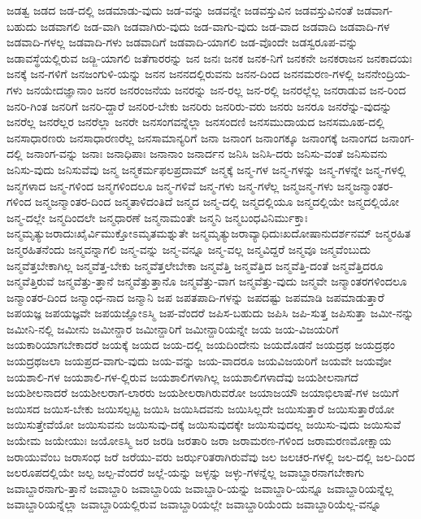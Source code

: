 {ಜಡತ್ವ
ಜಡದ
ಜಡ-ದಲ್ಲಿ
ಜಡಮಾಡು-ವುದು
ಜಡ-ವನ್ನು
ಜಡವನ್ನೇ
ಜಡವಸ್ತುವಿನ
ಜಡವಸ್ತುವಿನಂತೆ
ಜಡವಾಗ-ಬಹುದು
ಜಡವಾಗಲಿ
ಜಡ-ವಾಗಿ
ಜಡವಾಗಿರು-ವುದು
ಜಡ-ವಾಗು-ವುದು
ಜಡ-ವಾದ
ಜಡವಾದಿ
ಜಡವಾದಿ-ಗಳ
ಜಡವಾದಿ-ಗಳಲ್ಲ
ಜಡವಾದಿ-ಗಳು
ಜಡವಾದಿಗೆ
ಜಡವಾದಿ-ಯಾಗಲಿ
ಜಡ-ವೊಂದೇ
ಜಡಸ್ವರೂಪ-ವನ್ನು
ಜಡಾವಸ್ಥೆಯಲ್ಲಿರುವ
ಜಡ್ಜಿ-ಯಾಗಲಿ
ಜತೆಗಾರರನ್ನು
ಜನ
ಜನಃ
ಜನಕ
ಜನಕ-ನಿಗೆ
ಜನಕನೇ
ಜನಕರಾಜನ
ಜನಕಾದಯಃ
ಜನಕ್ಕೆ
ಜನ-ಗಳಿಗೆ
ಜನಜಂಗುಳಿ-ಯನ್ನು
ಜನನ
ಜನನದಲ್ಲಿರುವನು
ಜನನ-ದಿಂದ
ಜನನಮರಣ-ಗಳಲ್ಲಿ
ಜನನೇಂದ್ರಿಯ-ಗಳು
ಜನಯೇದಜ್ಞಾನಾಂ
ಜನರ
ಜನರಂಜನೆಯ
ಜನರನ್ನು
ಜನ-ರಲ್ಲ
ಜನ-ರಲ್ಲಿ
ಜನರಲ್ಲೆಲ್ಲ
ಜನರಾಡುವ
ಜನ-ರಿಂದ
ಜನರಿ-ಗಿಂತ
ಜನರಿಗೆ
ಜನರಿ-ದ್ದಾರೆ
ಜನರಿರ-ಬೇಕು
ಜನರಿರು
ಜನರಿರು-ವರು
ಜನರು
ಜನರೂ
ಜನರೆನ್ನು-ವುದನ್ನು
ಜನರೆಲ್ಲ
ಜನರೆಲ್ಲರ
ಜನರೆಲ್ಲಾ
ಜನರೇ
ಜನಸಂಗವನ್ನೆಲ್ಲಾ
ಜನಸಂದಣಿ
ಜನಸಮುದಾಯದ
ಜನಸಮೂಹ-ದಲ್ಲಿ
ಜನಸಾಧಾರಣರು
ಜನಸಾಧಾರಣರೆಲ್ಲ
ಜನಸಾಮಾನ್ಯರಿಗೆ
ಜನಾ
ಜನಾಂಗ
ಜನಾಂಗಕ್ಕೂ
ಜನಾಂಗಕ್ಕೆ
ಜನಾಂಗದ
ಜನಾಂಗ-ದಲ್ಲಿ
ಜನಾಂಗ-ವನ್ನು
ಜನಾಃ
ಜನಾಧಿಪಾಃ
ಜನಾನಾಂ
ಜನಾರ್ದನ
ಜನಿಸಿ
ಜನಿಸಿ-ದರು
ಜನಿಸು-ವಂತೆ
ಜನಿಸುವನು
ಜನಿಸು-ವುದು
ಜನಿಸುವೆವು
ಜನ್ಮ
ಜನ್ಮಕರ್ಮಫಲಪ್ರದಾಮ್
ಜನ್ಮಕ್ಕೆ
ಜನ್ಮ-ಗಳ
ಜನ್ಮ-ಗಳನ್ನು
ಜನ್ಮ-ಗಳನ್ನೇ
ಜನ್ಮ-ಗಳಲ್ಲಿ
ಜನ್ಮಗಳಾದ
ಜನ್ಮ-ಗಳಿಂದ
ಜನ್ಮಗಳಿಂದಲೂ
ಜನ್ಮ-ಗಳಿವೆ
ಜನ್ಮ-ಗಳು
ಜನ್ಮ-ಗಳೆಲ್ಲ
ಜನ್ಮಜನ್ಮ-ಗಳು
ಜನ್ಮಜನ್ಮಾಂತರ-ಗಳಿಂದ
ಜನ್ಮಜನ್ಮಾಂತರ-ದಿಂದ
ಜನ್ಮತಾಳಿದಂತಿದೆ
ಜನ್ಮದ
ಜನ್ಮ-ದಲ್ಲಿ
ಜನ್ಮದಲ್ಲಿಯೂ
ಜನ್ಮದಲ್ಲಿಯೇ
ಜನ್ಮದಲ್ಲಿಯೋ
ಜನ್ಮ-ದಲ್ಲೇ
ಜನ್ಮದಿಂದಲೇ
ಜನ್ಮಧಾರಣೆ
ಜನ್ಮನಾಮಂತೇ
ಜನ್ಮನಿ
ಜನ್ಮಬಂಧವಿನಿರ್ಮುಕ್ತಾಃ
ಜನ್ಮಮೃತ್ಯುಜರಾದುಃಖೈರ್ವಿಮುಕ್ತೋಽಮೃತಮಶ್ನುತೇ
ಜನ್ಮಮೃತ್ಯುಜರಾವ್ಯಾಧಿದುಃಖದೋಷಾನುದರ್ಶನಮ್
ಜನ್ಮರಹಿತ
ಜನ್ಮರಹಿತನೆಂದು
ಜನ್ಮವನ್ನಾಗಲಿ
ಜನ್ಮ-ವನ್ನು
ಜನ್ಮ-ವನ್ನೂ
ಜನ್ಮ-ವಲ್ಲ
ಜನ್ಮವಿದ್ದರೆ
ಜನ್ಮವೂ
ಜನ್ಮವೆಂಬುದು
ಜನ್ಮವೆತ್ತಬೇಕಾಗಿಲ್ಲ
ಜನ್ಮವೆತ್ತ-ಬೇಕು
ಜನ್ಮವೆತ್ತಲೇಬೇಕಾ
ಜನ್ಮವೆತ್ತಿ
ಜನ್ಮವೆತ್ತಿದ
ಜನ್ಮವೆತ್ತಿ-ದಂತೆ
ಜನ್ಮವೆತ್ತಿದರೂ
ಜನ್ಮವೆತ್ತಿರುವೆ
ಜನ್ಮವೆತ್ತು-ತ್ತಾನೆ
ಜನ್ಮವೆತ್ತುತ್ತಾನೊ
ಜನ್ಮವೆತ್ತು-ವಾಗ
ಜನ್ಮವೆತ್ತು-ವುದು
ಜನ್ಮವೇ
ಜನ್ಮಾಂತರಗಳಿಂದಲೂ
ಜನ್ಮಾಂತರ-ದಿಂದ
ಜನ್ಮಾಂಧ-ನಾದ
ಜನ್ಮಾನಿ
ಜಪ
ಜಪತಪಾದಿ-ಗಳನ್ನು
ಜಪದಷ್ಟು
ಜಪಮಾಡಿ
ಜಪಮಾಡುತ್ತಾರೆ
ಜಪಯಜ್ಞ
ಜಪಯಜ್ಞವೇ
ಜಪಯಜ್ಞೋಽಸ್ಮಿ
ಜಪ-ವೆಂದರೆ
ಜಪಿಸ-ಬಹುದು
ಜಪಿಸಿ
ಜಪಿ-ಸುತ್ತ
ಜಪಿಸುತ್ತಾ
ಜಮೀ-ನನ್ನು
ಜಮೀನಿ-ನಲ್ಲಿ
ಜಮೀನು
ಜಮೀನ್ದಾರ
ಜಮೀನ್ದಾರಿಗೆ
ಜಮೀನ್ದಾರಿಯನ್ನೇ
ಜಯ
ಜಯ-ವಿಜಯರಿಗೆ
ಜಯಕಾರಿಯಾಗಬೇಕಾದರೆ
ಜಯಕ್ಕೆ
ಜಯದ
ಜಯ-ದಲ್ಲಿ
ಜಯದಿಂದೇನು
ಜಯದೊಡನೆ
ಜಯದ್ರಥ
ಜಯದ್ರಥಂ
ಜಯದ್ರಥಜಲಾ
ಜಯಪ್ರದ-ವಾಗು-ವುದು
ಜಯ-ವನ್ನು
ಜಯ-ವಾದರೂ
ಜಯವಿಜಯರಿಗೆ
ಜಯವೇ
ಜಯವೋ
ಜಯಶಾಲಿ-ಗಳ
ಜಯಶಾಲಿ-ಗಳ-ಲ್ಲಿರುವ
ಜಯಶಾಲಿಗಳಾಗಿಲ್ಲ
ಜಯಶಾಲಿಗಳಾದೆವು
ಜಯಶೀಲನಾಗದೆ
ಜಯಶೀಲನಾದರೆ
ಜಯಶೀಲರಾಗ-ಲಾರರು
ಜಯಶೀಲರಾಗಿರುವರೋ
ಜಯಾಜಯೌ
ಜಯಾಭಿಲಾಷೆ-ಗಳ
ಜಯಿಗೆ
ಜಯಿಸದ
ಜಯಿಸ-ಬೇಕು
ಜಯಿಸಲ್ಪಟ್ಟ
ಜಯಿಸಿ
ಜಯಿಸಿದವನು
ಜಯಿಸಿಲ್ಲದೇ
ಜಯಿಸುತ್ತಾರೆ
ಜಯಿಸುತ್ತಾರೆಯೋ
ಜಯಿಸುತ್ತೇವೆಯೋ
ಜಯಿಸುವನು
ಜಯಿಸುವು-ದಕ್ಕೆ
ಜಯಿಸುವುದಕ್ಕೇ
ಜಯಿಸುವುದಲ್ಲ
ಜಯಿಸು-ವುದು
ಜಯಿಸುವೆ
ಜಯೇಮ
ಜಯೇಯುಃ
ಜಯೋಽಸ್ಮಿ
ಜರ
ಜರಡಿ
ಜರತಾರಿ
ಜರಾ
ಜರಾಮರಣ-ಗಳಿಂದ
ಜರಾಮರಣಮೋಕ್ಷಾಯ
ಜರಾಯುವೆಂಬ
ಜರಾಸಂಧ
ಜರೆ
ಜರೆಯು-ವರು
ಜರ್ಝರಿತರಾಗಿರುವೆವು
ಜಲ
ಜಲಚರ-ಗಳಲ್ಲಿ
ಜಲ-ದಲ್ಲಿ
ಜಲ-ದಿಂದ
ಜಲರೂಪದಲ್ಲಿಯೇ
ಜಲ್ಪ
ಜಲ್ಪ-ವೆಂದರೆ
ಜಲ್ಲೆ-ಯನ್ನು
ಜಳ್ಳನ್ನು
ಜಳ್ಳು-ಗಳನ್ನೆಲ್ಲ
ಜವಾಬ್ದಾರನಾಗಬೇಕಾಗು
ಜವಾಬ್ದಾರನಾಗು-ತ್ತಾನೆ
ಜವಾಬ್ದಾರಿ
ಜವಾಬ್ದಾರಿಯ
ಜವಾಬ್ದಾರಿ-ಯನ್ನು
ಜವಾಬ್ದಾರಿ-ಯನ್ನೂ
ಜವಾಬ್ದಾರಿಯನ್ನೆಲ್ಲ
ಜವಾಬ್ದಾರಿಯನ್ನೆಲ್ಲಾ
ಜವಾಬ್ದಾರಿಯಲ್ಲಿರುವ
ಜವಾಬ್ದಾರಿಯಲ್ಲೇ
ಜವಾಬ್ದಾರಿಯೆಂದು
ಜವಾಬ್ದಾರಿಯೆಲ್ಲ-ವನ್ನೂ
}
